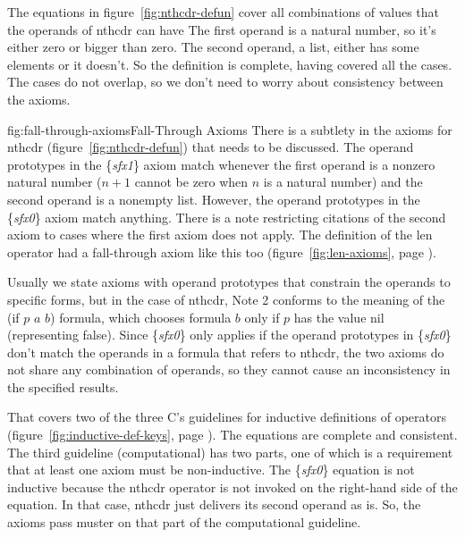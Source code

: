 
The equations in figure~\ref{fig:nthcdr-defun} cover all combinations
of values that the operands of \textsf{nthcdr} can have
The first operand is a natural number,
so it's either zero or bigger than zero.
The second operand, a list, either has some elements or it doesn't.
So the definition is complete, having covered all the cases.
The cases do not overlap, so we don't need to worry about
consistency between the axioms.

\begin{aside}{fig:fall-through-axioms}{Fall-Through Axioms}
There is a subtlety in the axioms for \textsf{nthcdr} (figure~\ref{fig:nthcdr-defun})
that needs to be discussed.
The operand prototypes in the
\{\emph{sfx1}\} axiom match whenever the first operand is a nonzero natural number
($n+1$ cannot be zero when $n$ is a natural number)
and the second operand is a nonempty list.
However, the operand prototypes in the \{\emph{sfx0}\} axiom match anything.
There is a note restricting
citations of the second axiom to cases
where the first axiom does not apply.
The definition of the \textsf{len} operator
had a fall-through axiom like this too
(figure~\ref{fig:len-axioms}, page \pageref{fig:len-axioms}).

Usually we state axioms with operand prototypes that constrain
the operands to specific forms,
but in the case of \textsf{nthcdr}, Note 2 conforms to the meaning
of the \textsf{(if $p$ $a$ $b$)} formula, which chooses formula $b$
only if $p$ has the value \textsf{nil} (representing false).
Since \{\emph{sfx0}\} only applies if the operand prototypes in
\{\emph{sfx0}\} don't match the operands in a formula that refers to \textsf{nthcdr},
the two axioms do not share any combination of operands, so they cannot
cause an inconsistency in the specified results.
\end{aside}

That covers two of the three C's guidelines for inductive definitions of operators
(figure~\ref{fig:inductive-def-keys}, page \pageref{fig:inductive-def-keys}).
The equations are complete and consistent.
The third guideline (computational) has two parts, one of which is
a requirement that at least one axiom must be non-inductive.
The \{\emph{sfx0}\} equation is not inductive because the \textsf{nthcdr} operator
is not invoked on the right-hand side of the equation.
In that case, \textsf{nthcdr} just delivers its second operand as is.
So, the axioms pass muster on that part of the computational guideline.

